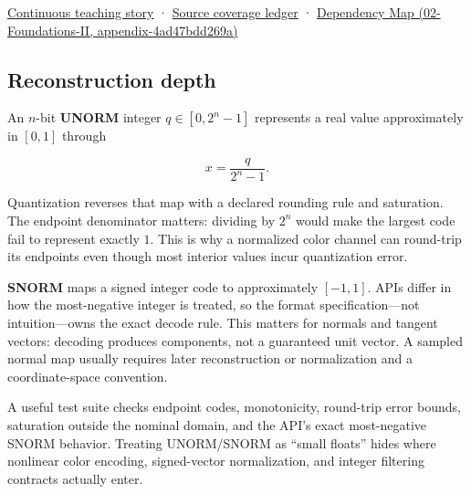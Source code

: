 \href{Continuous\%20Notes/Computing\%20Foundations\%20-\%20From\%20Bits\%20to\%20C++\%20and\%20Systems\%20APIs\#Choosing\%20what\%20information\%20to\%20keep}{Continuous teaching story} · \hyperref[appendix-fd090d982a15]{Source coverage ledger} · \href{}{Dependency Map (02-Foundations-II, appendix-4ad47bdd269a)}

\subsection{Reconstruction depth}\label{reconstruction-depth}

An \(n\)-bit \textbf{UNORM} integer \(q\in[0,2^n-1]\) represents a real value approximately in \([0,1]\) through

\[
x = \frac{q}{2^n-1}.
\]

Quantization reverses that map with a declared rounding rule and saturation. The endpoint denominator matters: dividing by \(2^n\) would make the largest code fail to represent exactly \(1\). This is why a normalized color channel can round-trip its endpoints even though most interior values incur quantization error.

\textbf{SNORM} maps a signed integer code to approximately \([-1,1]\). APIs differ in how the most-negative integer is treated, so the format specification---not intuition---owns the exact decode rule. This matters for normals and tangent vectors: decoding produces components, not a guaranteed unit vector. A sampled normal map usually requires later reconstruction or normalization and a coordinate-space convention.

A useful test suite checks endpoint codes, monotonicity, round-trip error bounds, saturation outside the nominal domain, and the API's exact most-negative SNORM behavior. Treating UNORM/SNORM as ``small floats'' hides where nonlinear color encoding, signed-vector normalization, and integer filtering contracts actually enter.
